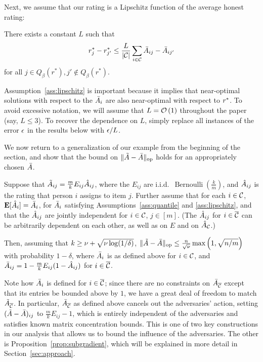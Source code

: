 Next, we assume that our rating is a Lipschitz function of the average 
honest rating:
\begin{assumption}
\label{ass:lipschitz}
There exists a constant $L$ such that 
\[ r^*_j - r^*_{j'} \leq \frac{L}{|\mathcal{C}|}\sum_{i \in \mathcal{C}} \bar{A}_{ij} - \bar{A}_{ij'} \]
for all $j \in Q_{\beta}(r^*), j' \not\in Q_{\beta}(r^*)$.
\end{assumption}
Assumption~\ref{ass:lipschitz} is important because it implies that 
near-optimal solutions with respect to the $\bar{A}_i$ are also near-optimal 
with respect to $r^*$.
To avoid excessive notation, we will assume that $L = \mathcal{O}\left( 1 \right)$ throughout 
the paper (say, $L \leq 3$). To recover the dependence on $L$, simply replace 
all instances of the error $\epsilon$ in the results below with $\epsilon/L$.

We now return to a generalization of our example from the beginning of the 
section, and show that the bound on $\|\tilde{A} - \bar{A}\|_{\mathrm{op}}$ holds for an 
appropriately chosen $\bar{A}$.
\begin{proposition}
\label{prop:sampling-reduction}
Suppose that $\tilde{A}_{ij} = \frac{m}{k}E_{ij}\hat{A}_{ij}$, 
where the $E_{ij}$ are i.i.d.~$\operatorname{Bernoulli}(\frac{k}{m})$, and 
$\hat{A}_{ij}$ is the rating that person $i$ assigns to item $j$. Further 
assume that for each $i \in \mathcal{C}$, $\mathbf{E}[\hat{A}_{i}] = \bar{A}_i$, 
for $\bar{A}_i$ satisfying Assumptions~\ref{ass:quantile} and \ref{ass:lipschitz},
 and that the $\hat{A}_{ij}$ are jointly independent for 
$i \in \mathcal{C}$, $j \in [m]$. (The $\hat{A}_{ij}$ for $i \in \overline{\mathcal{C}}$ can be 
arbitrarily dependent on each other, as well as on $E$ and on 
$\hat{A}_{\mathcal{C}}$.)

Then, assuming that $k \geq \nu + \sqrt{\nu \log(1/\delta)}$, 
$\|\tilde{A} - \bar{A}\|_{\mathrm{op}} \leq \frac{n}{\sqrt{\nu}}\max\left( 1, \sqrt{n/m} \right)$
with probability $1-\delta$, where $\bar{A}_i$ is 
as defined above for $i \in \mathcal{C}$, and 
$\bar{A}_{ij} = 1 - \frac{m}{k}E_{ij}(1 - \hat{A}_{ij})$ for $i \in \overline{\mathcal{C}}$.
\end{proposition}
Note how $\bar{A}_i$ is defined for $i \in \overline{\mathcal{C}}$; since there are no constraints 
on $\bar{A}_{\overline{\mathcal{C}}}$ except that its entries be bounded above by $1$, we have a 
great deal of freedom to match $\tilde{A}_{\overline{\mathcal{C}}}$. In particular, $\bar{A}_{\overline{\mathcal{C}}}$ 
as defined above cancels out the adversaries' action, setting 
$(\tilde{A} - \bar{A})_{ij}$ to $\frac{m}{k}E_{ij} - 1$, which is entirely independent 
of the adversaries and satisfies known matrix concentration bounds.
This is one of two key constructions in our analysis that allows us to bound 
the influence of the adversaries. The other is Proposition~\ref{prop:subgradient}, 
which will be explained in more detail in Section~\ref{sec:approach}.

